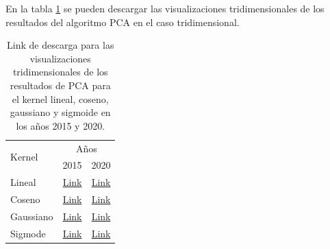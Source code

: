 En la tabla \ref{table:pca_results} se pueden descargar las visualizaciones tridimensionales de los resultados del algoritmo PCA en el caso tridimensional.

\begin{table}[H]
    \centering
    \begin{tabular}{lrr} \hline
        \multirow{2}{*}{Kernel} & \multicolumn{2}{c}{Años}                                                                                                                                                                                                                                                    \\ \cline{2-3}
                                & 2015                                                                                                                                 & 2020                                                                                                                                 \\ \hline
        Lineal                  & \href{https://github.com/giovannilopez9808/Reconocimiento_de_patrones_proyecto/raw/main/Graphics/Data_2015/PCA_3D_linear.mp4}{Link}  & \href{https://github.com/giovannilopez9808/Reconocimiento_de_patrones_proyecto/raw/main/Graphics/Data_2020/PCA_3D_linear.mp4}{Link}  \\
        Coseno                  & \href{https://github.com/giovannilopez9808/Reconocimiento_de_patrones_proyecto/raw/main/Graphics/Data_2015/PCA_3D_cosine.mp4}{Link}  & \href{https://github.com/giovannilopez9808/Reconocimiento_de_patrones_proyecto/raw/main/Graphics/Data_2020/PCA_3D_cosine.mp4}{Link}  \\
        Gaussiano               & \href{https://github.com/giovannilopez9808/Reconocimiento_de_patrones_proyecto/raw/main/Graphics/Data_2015/PCA_3D_rbf.mp4}{Link}     & \href{https://github.com/giovannilopez9808/Reconocimiento_de_patrones_proyecto/raw/main/Graphics/Data_2020/PCA_3D_rbf.mp4}{Link}     \\
        Sigmode                 & \href{https://github.com/giovannilopez9808/Reconocimiento_de_patrones_proyecto/raw/main/Graphics/Data_2015/PCA_3D_sigmoid.mp4}{Link} & \href{https://github.com/giovannilopez9808/Reconocimiento_de_patrones_proyecto/raw/main/Graphics/Data_2020/PCA_3D_sigmoid.mp4}{Link} \\ \hline
    \end{tabular}
    \caption{Link de descarga para las visualizaciones tridimensionales de los resultados de PCA para el kernel lineal, coseno, gaussiano y sigmoide en los años 2015 y 2020.}
    \label{table:pca_results}
\end{table}